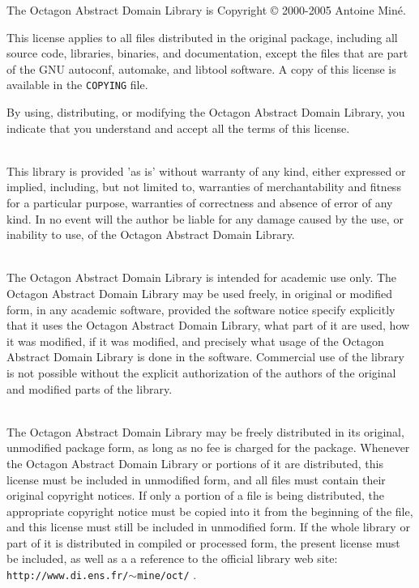 \documentclass[twosides]{report}
\begin{document}
{\large

\noindent
The Octagon Abstract Domain Library is Copyright \copyright 
2000-2005 Antoine Min\'e.

\bigskip

\noindent
This license applies to all files distributed in the original package,
including all source code, libraries, binaries, and documentation, except
the files that are part of the GNU autoconf, automake, and libtool
software.
A copy of this license is available in the \texttt{COPYING} file.

\bigskip

\noindent
By using, distributing, or modifying the Octagon Abstract Domain Library,
you indicate that you understand and accept all the terms of this license.

\bigskip

\\
This library is provided 'as is' without warranty of any kind, either
expressed or implied, including, but not limited to, warranties of
merchantability and fitness for a particular purpose, warranties of
correctness and absence of error of any kind.
In no event will the author be liable for any damage caused by the use,
or inability to use, of the Octagon Abstract Domain Library.


\bigskip

\\
The Octagon Abstract Domain Library is intended for academic use only.
The Octagon Abstract Domain Library may be used freely, in original or
modified form, in any academic software, provided the software notice specify
explicitly that it uses the Octagon Abstract Domain Library, what part
of it are used, how it was modified, if it was modified, and precisely
what usage of the Octagon Abstract Domain Library is done in the
software.
Commercial use of the library is not possible without the explicit
authorization of the authors of the original and modified parts of the
library.

\bigskip

\\
The Octagon Abstract Domain Library may be freely distributed in its original,
unmodified package form, as long as no fee is charged for the package.
Whenever the Octagon Abstract Domain Library or portions of it are
distributed, this license must be included in unmodified form, and all files
must contain their original copyright notices.
If only a portion of a file is being distributed, the appropriate copyright
notice must be copied into it from the beginning of the file, and this
license must still be included in unmodified form.
If the whole library or part of it is distributed in compiled or processed
form, the present license must be included, as well as a a reference to
the official library web site: \texttt{http://www.di.ens.fr/$\sim$mine/oct/} .

}
\end{document}
